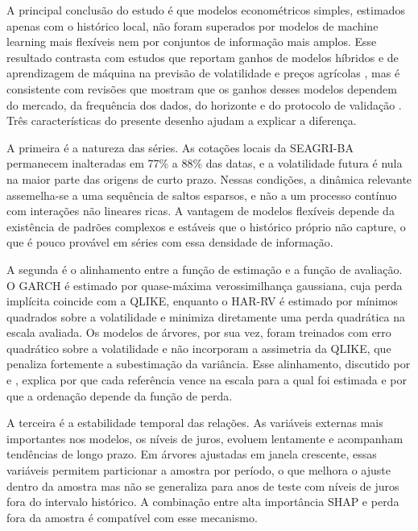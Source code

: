 \documentclass[a4paper,fleqn]{cas-sc}
\begin{document}
A principal conclusão do estudo é que modelos econométricos simples, estimados apenas com o histórico local, não foram superados por modelos de machine learning mais flexíveis nem por conjuntos de informação mais amplos. Esse resultado contrasta com estudos que reportam ganhos de modelos híbridos e de aprendizagem de máquina na previsão de volatilidade e preços agrícolas \citep{Manogna2025HybridVolatility,Zhang2025ClimateRealizedVolatility,Jin2024CoffeePriceML}, mas é consistente com revisões que mostram que os ganhos desses modelos dependem do mercado, da frequência dos dados, do horizonte e do protocolo de validação \citep{Guindani2024AgriculturalForecasting}. Três características do presente desenho ajudam a explicar a diferença.

A primeira é a natureza das séries. As cotações locais da SEAGRI-BA permanecem inalteradas em 77\% a 88\% das datas, e a volatilidade futura é nula na maior parte das origens de curto prazo. Nessas condições, a dinâmica relevante assemelha-se a uma sequência de saltos esparsos, e não a um processo contínuo com interações não lineares ricas. A vantagem de modelos flexíveis depende da existência de padrões complexos e estáveis que o histórico próprio não capture, o que é pouco provável em séries com essa densidade de informação.

A segunda é o alinhamento entre a função de estimação e a função de avaliação. O GARCH é estimado por quase-máxima verossimilhança gaussiana, cuja perda implícita coincide com a QLIKE, enquanto o HAR-RV é estimado por mínimos quadrados sobre a volatilidade e minimiza diretamente uma perda quadrática na escala avaliada. Os modelos de árvores, por sua vez, foram treinados com erro quadrático sobre a volatilidade e não incorporam a assimetria da QLIKE, que penaliza fortemente a subestimação da variância. Esse alinhamento, discutido por \citet{Patton2011VolatilityProxy} e \citet{HansenLunde2006ConsistentRanking}, explica por que cada referência vence na escala para a qual foi estimada e por que a ordenação depende da função de perda.

A terceira é a estabilidade temporal das relações. As variáveis externas mais importantes nos modelos, os níveis de juros, evoluem lentamente e acompanham tendências de longo prazo. Em árvores ajustadas em janela crescente, essas variáveis permitem particionar a amostra por período, o que melhora o ajuste dentro da amostra mas não se generaliza para anos de teste com níveis de juros fora do intervalo histórico. A combinação entre alta importância SHAP e perda fora da amostra é compatível com esse mecanismo.
\end{document}
